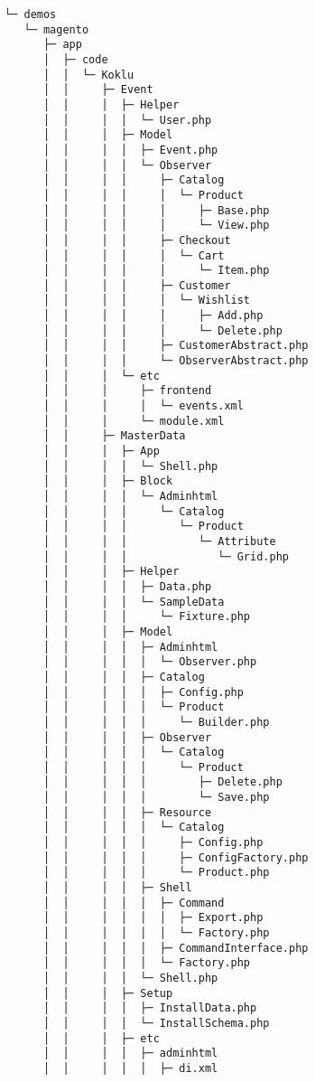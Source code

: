 \begin{codebox}
\begin{verbatim}
└─ demos
   └─ magento
      ├─ app
      │  ├─ code
      │  │  └─ Koklu
      │  │     ├─ Event
      │  │     │  ├─ Helper
      │  │     │  │  └─ User.php
      │  │     │  ├─ Model
      │  │     │  │  ├─ Event.php
      │  │     │  │  └─ Observer
      │  │     │  │     ├─ Catalog
      │  │     │  │     │  └─ Product
      │  │     │  │     │     ├─ Base.php
      │  │     │  │     │     └─ View.php
      │  │     │  │     ├─ Checkout
      │  │     │  │     │  └─ Cart
      │  │     │  │     │     └─ Item.php
      │  │     │  │     ├─ Customer
      │  │     │  │     │  └─ Wishlist
      │  │     │  │     │     ├─ Add.php
      │  │     │  │     │     └─ Delete.php
      │  │     │  │     ├─ CustomerAbstract.php
      │  │     │  │     └─ ObserverAbstract.php
      │  │     │  └─ etc
      │  │     │     ├─ frontend
      │  │     │     │  └─ events.xml
      │  │     │     └─ module.xml
      │  │     ├─ MasterData
      │  │     │  ├─ App
      │  │     │  │  └─ Shell.php
      │  │     │  ├─ Block
      │  │     │  │  └─ Adminhtml
      │  │     │  │     └─ Catalog
      │  │     │  │        └─ Product
      │  │     │  │           └─ Attribute
      │  │     │  │              └─ Grid.php
      │  │     │  ├─ Helper
      │  │     │  │  ├─ Data.php
      │  │     │  │  └─ SampleData
      │  │     │  │     └─ Fixture.php
      │  │     │  ├─ Model
      │  │     │  │  ├─ Adminhtml
      │  │     │  │  │  └─ Observer.php
      │  │     │  │  ├─ Catalog
      │  │     │  │  │  ├─ Config.php
      │  │     │  │  │  └─ Product
      │  │     │  │  │     └─ Builder.php
      │  │     │  │  ├─ Observer
      │  │     │  │  │  └─ Catalog
      │  │     │  │  │     └─ Product
      │  │     │  │  │        ├─ Delete.php
      │  │     │  │  │        └─ Save.php
      │  │     │  │  ├─ Resource
      │  │     │  │  │  └─ Catalog
      │  │     │  │  │     ├─ Config.php
      │  │     │  │  │     ├─ ConfigFactory.php
      │  │     │  │  │     └─ Product.php
      │  │     │  │  ├─ Shell
      │  │     │  │  │  ├─ Command
      │  │     │  │  │  │  ├─ Export.php
      │  │     │  │  │  │  └─ Factory.php
      │  │     │  │  │  ├─ CommandInterface.php
      │  │     │  │  │  └─ Factory.php
      │  │     │  │  └─ Shell.php
      │  │     │  ├─ Setup
      │  │     │  │  ├─ InstallData.php
      │  │     │  │  └─ InstallSchema.php
      │  │     │  ├─ etc
      │  │     │  │  ├─ adminhtml
      │  │     │  │  │  ├─ di.xml

\end{verbatim}
\end{codebox}
